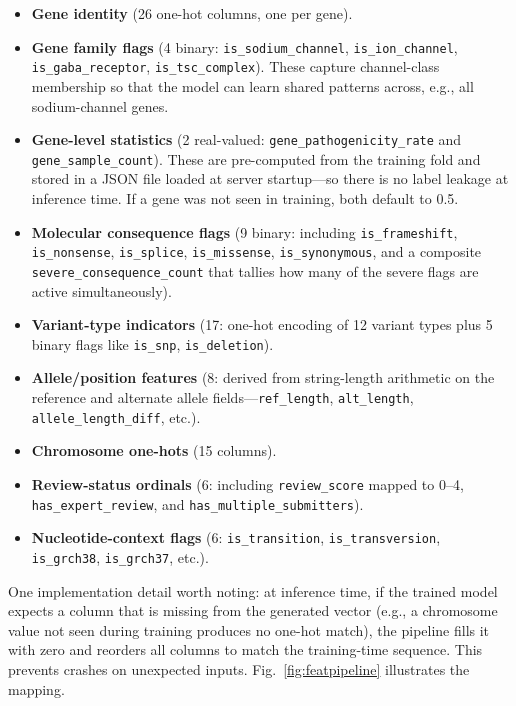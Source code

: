 \documentclass[12pt,a4paper]{article}
\begin{document}
\begin{itemize}
  \item \textbf{Gene identity} (26 one-hot columns, one per gene).
  \item \textbf{Gene family flags} (4 binary:
        \texttt{is\_sodium\_channel}, \texttt{is\_ion\_channel},
        \texttt{is\_gaba\_receptor}, \texttt{is\_tsc\_complex}).
        These capture channel-class membership so that the model
        can learn shared patterns across, e.g., all sodium-channel
        genes.
  \item \textbf{Gene-level statistics} (2 real-valued:
        \texttt{gene\_pathogenicity\_rate} and
        \texttt{gene\_sample\_count}). These are pre-computed from
        the training fold and stored in a JSON file loaded at
        server startup---so there is no label leakage at inference
        time. If a gene was not seen in training, both default
        to 0.5.
  \item \textbf{Molecular consequence flags} (9 binary: including
        \texttt{is\_frameshift}, \texttt{is\_nonsense},
        \texttt{is\_splice}, \texttt{is\_missense},
        \texttt{is\_synonymous}, and a composite
        \texttt{severe\_consequence\_count} that tallies how many
        of the severe flags are active simultaneously).
  \item \textbf{Variant-type indicators} (17: one-hot encoding of
        12 variant types plus 5 binary flags like \texttt{is\_snp},
        \texttt{is\_deletion}).
  \item \textbf{Allele/position features} (8: derived from
        string-length arithmetic on the reference and alternate
        allele fields---\texttt{ref\_length}, \texttt{alt\_length},
        \texttt{allele\_length\_diff}, etc.).
  \item \textbf{Chromosome one-hots} (15 columns).
  \item \textbf{Review-status ordinals} (6: including
        \texttt{review\_score} mapped to 0--4,
        \texttt{has\_expert\_review}, and
        \texttt{has\_multiple\_submitters}).
  \item \textbf{Nucleotide-context flags} (6:
        \texttt{is\_transition}, \texttt{is\_transversion},
        \texttt{is\_grch38}, \texttt{is\_grch37}, etc.).
\end{itemize}

One implementation detail worth noting: at inference time, if the
trained model expects a column that is missing from the generated
vector (e.g., a chromosome value not seen during training produces
no one-hot match), the pipeline fills it with zero and reorders all
columns to match the training-time sequence. This prevents crashes
on unexpected inputs. Fig.~\ref{fig:featpipeline} illustrates the
mapping.
\end{document}
